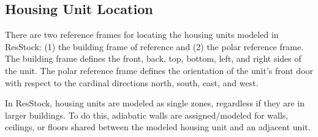 \subsection{Housing Unit Location}

There are two reference frames for locating the housing units modeled in ResStock: (1) the building frame of reference and (2) the polar reference frame. The building frame defines the front, back, top, bottom, left, and right sides of the unit. The polar reference frame defines the orientation of the unit's front door with respect to the cardinal directions north, south, east, and west. 

In ResStock, housing units are modeled as single zones, regardless if they are in larger buildings. To do this, adiabatic walls are assigned/modeled for walls, ceilings, or floors shared between the modeled housing unit and an adjacent unit.


